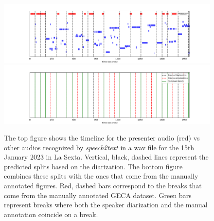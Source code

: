 \documentclass[12pt]{article}
\begin{document}
	
	\begin{figure}[H]
		\centering
		\includegraphics[width=120mm]{figures/speakers_all}
		\includegraphics[width=120mm]{figures/speaker_timeline}
		\caption{The top figure shows the timeline for the presenter audio (red) vs other audios recognized by \textit{speech2text} in a wav file for the 15th January 2023 in La Sexta. Vertical, black, dashed lines represent the predicted splits based on the diarization. The bottom figure combines these splits with the ones that come from the manually annotated figures. Red, dashed bars correspond to the breaks that come from the manually annotated GECA dataset. Green bars represent breaks where both the speaker diarization and the manual annotation coincide on a break. }
		\label{fig:diarization}
	\end{figure}
	
	
	
	
	\clearpage
	
	
	
	
	
	
	
	
	
	
	
	
	
	
	
\end{document}
